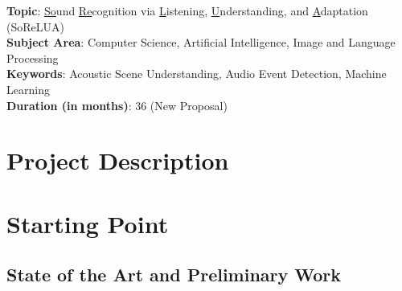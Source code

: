 \documentclass[11pt]{article}
\begin{document}
\vspace{1cm}

\noindent \textbf{Topic}: \underline{So}und \underline{Re}cognition 
via \underline{L}istening, \underline{U}nderstanding, and \underline{A}daptation (SoReLUA) \\
\textbf{Subject Area}: Computer Science, Artificial Intelligence, Image and Language Processing \\
\textbf{Keywords}: Acoustic Scene Understanding, Audio Event Detection, Machine Learning \\ %
\textbf{Duration (in months)}: 36 (New Proposal) \\
%


\section*{Project Description}

\section{Starting Point}

\subsection{State of the Art and Preliminary Work}


\end{document}
